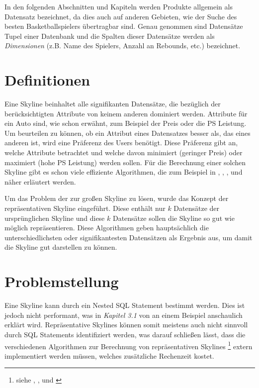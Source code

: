 In den folgenden Abschnitten und Kapiteln werden Produkte allgemein als Datensatz bezeichnet, da dies auch auf anderen Gebieten, wie der Suche des besten Basketballspielers übertragbar sind.
Genau genommen sind Datensätze Tupel einer Datenbank und die Spalten dieser Datensätze werden als \textit{Dimensionen} (z.B. Name des Spielers, Anzahl an Rebounds, etc.) bezeichnet.
\section{Definitionen}
\label{ch:Einleitung:sec:Definitionen}
Eine Skyline beinhaltet alle signifikanten Datensätze, die bezüglich der berücksichtigten Attribute von keinem anderen dominiert werden. Attribute für ein Auto sind, wie schon erwähnt, zum Beispiel der Preis oder die PS Leistung. Um beurteilen zu können, ob ein Attribut eines Datensatzes besser als, das eines anderen ist, wird eine Präferenz des Users benötigt. Diese Präferenz gibt an, welche Attribute betrachtet und welche davon minimiert (geringer Preis) oder maximiert (hohe PS Leistung) werden sollen. Für die Berechnung einer solchen Skyline gibt es schon viele effiziente Algorithmen, die zum Beispiel in \cite{borzsony2001skyline}, \cite{Chan:2006:HDS:2117976.2118017}, \cite{Kossmann:2002:SSS:1287369.1287394}, \cite{Papadias:2003:OPA:872757.872814} und \cite{Tan:2001:EPS:645927.672217} näher erläutert werden.

Um das Problem der zur großen Skyline zu lösen, wurde das Konzept der repräsentativen Skyline eingeführt. Diese enthält nur $k$ Datensätze der ursprünglichen Skyline und diese $k$ Datensätze sollen die Skyline so gut wie möglich repräsentieren. Diese Algorithmen geben hauptsächlich die unterschiedlichsten oder signifikantesten Datensätzen als Ergebnis aus, um damit die Skyline gut darstellen zu können. 
\section{Problemstellung}
\label{ch:Einleitung:sec:Problemstellung}
Eine Skyline kann durch ein Nested SQL Statement bestimmt werden. Dies ist jedoch nicht performant, was in \textit{Kapitel 3.1} von \cite{borzsony2001skyline} an einem Beispiel anschaulich erklärt wird. Repräsentative Skylines können somit meistens auch nicht sinnvoll durch SQL Statements identifiziert werden, was darauf schließen lässt, dass die verschiedenen Algorithmen zur Berechnung von repräsentativen Skylines \footnote{siehe \cite{Tao:2009:DRS:1546683.1547325}, \cite{cai2015efficient}, \cite{magnani2014taking} und \cite{4221657}} extern implementiert werden müssen, welches zusätzliche Rechenzeit kostet.

